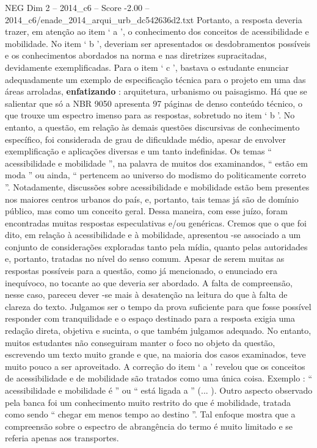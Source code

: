 \begin{textsample}{NEG Dim 2 – 2014\_c6 – Score -2.00 – 2014\_c6/enade\_2014\_arqui\_urb\_dc542636d2.txt}
Portanto, a resposta deveria trazer, em atenção ao item ‘ a ’, o conhecimento dos conceitos de acessibilidade e mobilidade.
No item ‘ b ’, deveriam ser apresentados os desdobramentos possíveis e os conhecimentos abordados na norma e nas diretrizes supracitadas, devidamente exemplificadas.
Para o item ‘ c ’, bastava o estudante enunciar adequadamente um exemplo de especificação técnica para o projeto em uma das áreas arroladas, \textbf{enfatizando} : arquitetura, urbanismo ou paisagismo.
Há que se salientar que só a NBR 9050 apresenta 97 páginas de denso conteúdo técnico, o que trouxe um espectro imenso para as respostas, sobretudo no item ‘ b ’.
No entanto, a questão, em relação às demais questões discursivas de conhecimento específico, foi considerada de grau de dificuldade médio, apesar de envolver exemplificação e aplicações diversas e um tanto indefinidas.
Os temas “ acessibilidade e mobilidade ”, na palavra de muitos dos examinandos, “ estão em moda ” ou ainda, “ pertencem ao universo do modismo do politicamente correto ”.
Notadamente, discussões sobre acessibilidade e mobilidade estão bem presentes nos maiores centros urbanos do país, e, portanto, tais temas já são de domínio público, mas como um conceito geral.
Dessa maneira, com esse juízo, foram encontradas muitas respostas especulativas e/ou genéricas.
Cremos que o que foi dito, em relação à acessibilidade e à mobilidade, apresentou -se associado a um conjunto de considerações exploradas tanto pela mídia, quanto pelas autoridades e, portanto, tratadas no nível do senso comum.
Apesar de serem muitas as respostas possíveis para a questão, como já mencionado, o enunciado era inequívoco, no tocante ao que deveria ser abordado.
A falta de compreensão, nesse caso, pareceu dever -se mais à desatenção na leitura do que à falta de clareza do texto.
Julgamos ser o tempo da prova suficiente para que fosse possível responder com tranquilidade e o espaço destinado para a resposta exigia uma redação direta, objetiva e sucinta, o que também julgamos adequado.
No entanto, muitos estudantes não conseguiram manter o foco no objeto da questão, escrevendo um texto muito grande e que, na maioria dos casos examinados, teve muito pouco a ser aproveitado.
A correção do item ‘ a ’ revelou que os conceitos de acessibilidade e de mobilidade são tratados como uma única coisa.
Exemplo : “ acessibilidade e mobilidade é ” ou “ está ligada a ” (... ).
Outro aspecto observado pela banca foi um conhecimento muito restrito do que é mobilidade, tratada como sendo “ chegar em menos tempo ao destino ”.
Tal enfoque mostra que a compreensão sobre o espectro de abrangência do termo é muito limitado e se referia apenas aos transportes.

\end{textsample}
